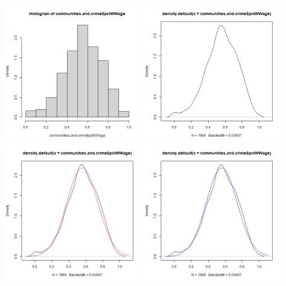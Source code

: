 \documentclass[12pt, letterpaper]{report}
\begin{document}
\begin{center}
\includegraphics[width=0.45\textwidth]{normal/pctWWage_hist}
\includegraphics[width=0.45\textwidth]{normal/pctWWage_density}
\includegraphics[width=0.45\textwidth]{normal/pctWWage_mle}
\includegraphics[width=0.45\textwidth]{normal/pctWWage_mm}
\end{center}
\end{document}
